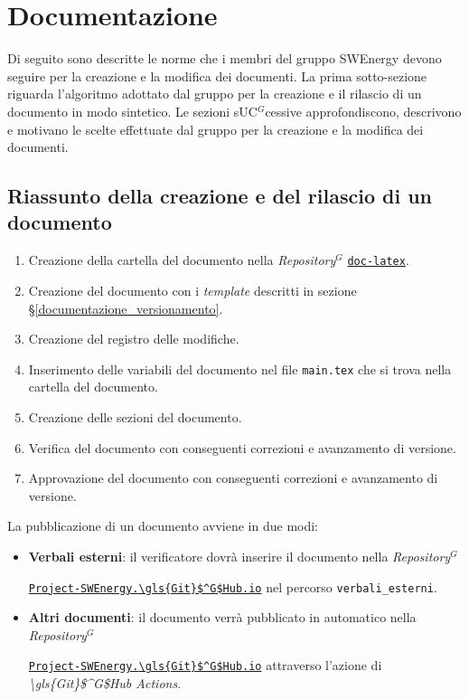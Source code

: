 \section{Documentazione}

Di seguito sono descritte le norme che i membri del gruppo SWEnergy devono
seguire per la creazione e la modifica dei documenti. La prima sotto-sezione
riguarda l'algoritmo adottato dal gruppo per la creazione e il rilascio di un
documento in modo sintetico. Le sezioni s\gls{UC}$^G$cessive approfondiscono, descrivono
e motivano le scelte effettuate dal gruppo per la creazione e la modifica dei
documenti.

\subsection{Riassunto della creazione e del rilascio di un documento}

\begin{enumerate}
	\item Creazione della cartella del documento nella \textit{\gls{Repository}$^G$}
	      \href{https://\gls{\gls{Git}$^G$Hub}.com/Project-SWEnergy/doc-latex}{\texttt{doc-latex}}.
	\item Creazione del documento con i \textit{template} descritti in
	      sezione \S\ref{documentazione_versionamento}.
	\item Creazione del registro delle modifiche.
	\item Inserimento delle variabili del documento nel file
	      \texttt{main.tex} che si trova nella cartella del documento.
	\item Creazione delle sezioni del documento.
	\item Verifica del documento con conseguenti correzioni e avanzamento di
	      versione.
	\item Approvazione del documento con conseguenti correzioni e avanzamento
	      di versione.
\end{enumerate}

La pubblicazione di un documento avviene in due modi:
\begin{itemize}
	\item \textbf{Verbali esterni}: il verificatore dovrà inserire il documento
	      nella \textit{\gls{Repository}$^G$}
	      \begin{sloppypar}
		      \href{https://\gls{\gls{Git}$^G$Hub}.com/Project-SWEnergy/Project-SWEnergy.\gls{\gls{Git}$^G$Hub}.io}{\texttt{Project-SWEnergy.\gls{\gls{Git}$^G$Hub}.io}}
		      nel percorso \texttt{verbali\_esterni}.
	      \end{sloppypar}
	\item \textbf{Altri documenti}: il documento verrà pubblicato in automatico
	      nella \textit{\gls{Repository}$^G$}
	      \begin{sloppypar}
		      \href{https://\gls{\gls{Git}$^G$Hub}.com/Project-SWEnergy/Project-SWEnergy.\gls{\gls{Git}$^G$Hub}.io}{\texttt{Project-SWEnergy.\gls{\gls{Git}$^G$Hub}.io}}
		      attraverso l'azione di \textit{\gls{\gls{Git}$^G$Hub} Actions}.
	      \end{sloppypar}
\end{itemize}

